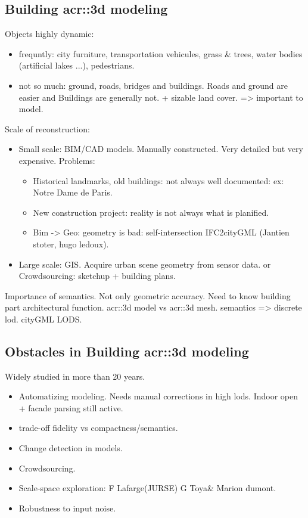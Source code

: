     \subsection{Building \gls*{acr::3d} modeling}
        \label{subsec::introduction::urban_3d_reconstruction::building_3d_modeling}
        Objects highly dynamic:
        \begin{itemize}
            \item frequntly: city furniture, transportation vehicules, grass \& trees, water bodies (artificial lakes ...), pedestrians. 
            \item not so much: ground, roads, bridges and buildings. Roads and ground are easier and Buildings are generally not. + sizable land cover. => important to model.\\
        \end{itemize}
        Scale of reconstruction:
        \begin{itemize}
            \item Small scale: BIM/CAD models. Manually constructed. Very detailed but very expensive. Problems:
            \begin{itemize}
                \item Historical landmarks, old buildings: not always well documented: ex: Notre Dame de Paris. 
                \item New construction project: reality is not always what is planified. 
                \item Bim -> Geo: geometry is bad: self-intersection IFC2cityGML (Jantien stoter, hugo ledoux). 
            \end{itemize}
            \item Large scale: GIS. Acquire urban scene geometry from sensor data. or Crowdsourcing: sketchup + building plans.
        \end{itemize}
        Importance of semantics. Not only geometric accuracy. Need to know building part architectural function. \gls{acr::3d} model vs \gls{acr::3d} mesh.
        semantics => discrete lod. cityGML LODS.\\
    \subsection{Obstacles in Building \gls{acr::3d} modeling}
        \label{subsec::introduction::urban_3d_reconstruction::challenges}
        Widely studied in more than 20 years.\\
        \begin{itemize}
            \item Automatizing modeling. Needs manual corrections in high lods. Indoor open + facade parsing still active. 
            \item trade-off fidelity vs compactness/semantics. 
            \item Change detection in models. 
            \item Crowdsourcing. 
            \item Scale-space exploration: F Lafarge(JURSE) G Toya\& Marion dumont. 
            \item Robustness to input noise.
        \end{itemize}
